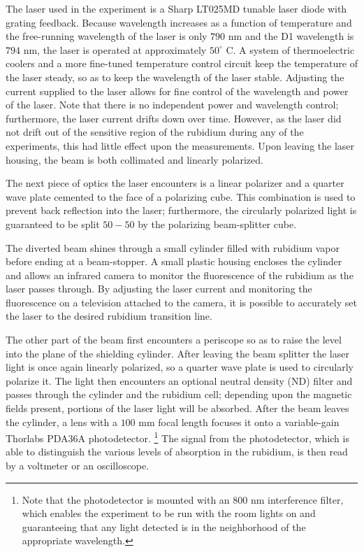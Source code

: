 The laser used in the experiment is a Sharp LT025MD tunable laser diode with grating feedback. Because wavelength increases as a function of temperature and the free-running wavelength of the laser is only $790$ nm and the D1 wavelength is $794$ nm, the laser is operated at approximately $50^{\circ}$ C. A system of thermoelectric coolers and a more fine-tuned temperature control circuit keep the temperature of the laser steady, so as to keep the wavelength of the laser stable.   Adjusting the current supplied to the laser allows for fine control of the wavelength and power of the laser. Note that there is no independent power and wavelength control; furthermore, the laser current drifts down over time. However, as the laser did not drift out of the sensitive region of the rubidium during any of the experiments, this had little effect upon the measurements. Upon leaving the laser housing, the beam is both collimated and linearly polarized.

The next piece of optics the laser encounters is a linear polarizer and a quarter wave plate cemented to the face of a polarizing cube. This combination is used to prevent back reflection into the laser; furthermore, the circularly polarized light is guaranteed to be split $50-50$ by the polarizing beam-splitter cube. 

The diverted beam shines through a small cylinder filled with rubidium vapor before ending at a beam-stopper. A small plastic housing encloses the cylinder and allows an infrared camera to monitor the fluorescence of the rubidium as the laser passes through. By adjusting the laser current and monitoring the fluorescence on a television attached to the camera, it is possible to accurately set the laser to the desired rubidium transition line.

The other part of the beam first encounters a periscope so as to raise the level into the plane of the shielding cylinder. After leaving the beam splitter the laser light is once again linearly polarized, so a quarter wave plate is used to circularly polarize it. The light then encounters an optional neutral density (ND) filter and passes through the cylinder and the rubidium cell; depending upon the magnetic fields present, portions of the laser light will be absorbed. After the beam leaves the cylinder, a lens with a $100$ mm focal length focuses it onto a variable-gain Thorlabs PDA36A photodetector. \footnote{Note that the photodetector is mounted with an $800$ nm interference filter, which enables the experiment to be run with the room lights on and guaranteeing that any light detected is in the neighborhood of the appropriate wavelength.} The signal from the photodetector, which is able to distinguish the various levels of absorption in the rubidium, is then read by a voltmeter or an oscilloscope.

